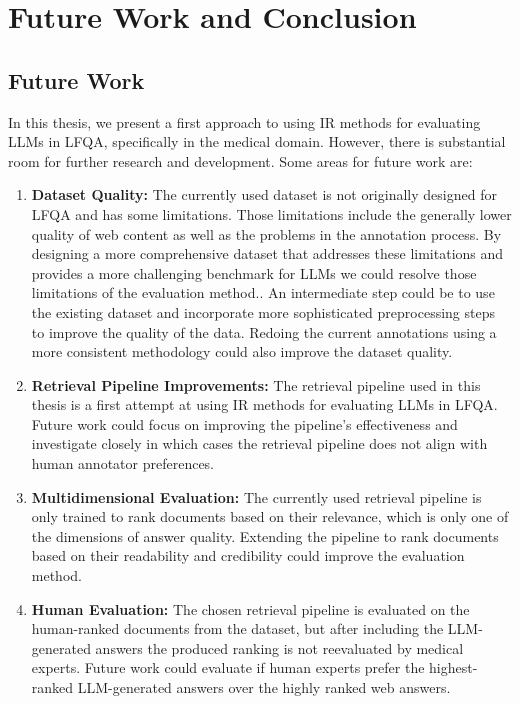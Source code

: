 \chapter{Future Work and Conclusion}\label{conclusion}

\section{Future Work}
In this thesis, we present a first approach to using IR methods for evaluating LLMs in LFQA, specifically in the medical domain.
However, there is substantial room for further research and development.
Some areas for future work are:

\begin{enumerate}
    \item \textbf{Dataset Quality:} The currently used dataset is not originally designed for LFQA and has some limitations. Those limitations include the generally lower quality of web content as well as the problems in the annotation process. By designing a more comprehensive dataset that addresses these limitations and provides a more challenging benchmark for LLMs we could resolve those limitations of the evaluation method.. An intermediate step could be to use the existing dataset and incorporate more sophisticated preprocessing steps to improve the quality of the data. Redoing the current annotations using a more consistent methodology could also improve the dataset quality.
    \item \textbf{Retrieval Pipeline Improvements:} The retrieval pipeline used in this thesis is a first attempt at using IR methods for evaluating LLMs in LFQA. Future work could focus on improving the pipeline's effectiveness and investigate closely in which cases the retrieval pipeline does not align with human annotator preferences. 
    \item \textbf{Multidimensional Evaluation:} The currently used retrieval pipeline is only trained to rank documents based on their relevance, which is only one of the dimensions of answer quality. Extending the pipeline to rank documents based on their readability and credibility could improve the evaluation method.
    \item \textbf{Human Evaluation:} The chosen retrieval pipeline is evaluated on the human-ranked documents from the dataset, but after including the LLM-generated answers the produced ranking is not reevaluated by medical experts. Future work could evaluate if human experts prefer the highest-ranked LLM-generated answers over the highly ranked web answers.

\end{enumerate}
